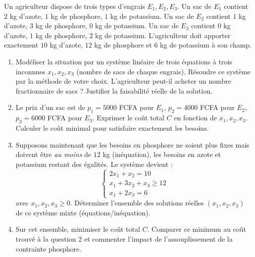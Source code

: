 \documentclass[11pt]{article}
\begin{document}
\begin{exercice}
Un agriculteur dispose de trois types d'engrais $E_1, E_2, E_3$. Un sac de $E_1$ contient $2$ kg d'azote, $1$ kg de phosphore, $1$ kg de potassium. Un sac de $E_2$ contient $1$ kg d'azote, $3$ kg de phosphore, $0$ kg de potassium. Un sac de $E_3$ contient $0$ kg d'azote, $1$ kg de phosphore, $2$ kg de potassium. L'agriculteur doit apporter exactement $10$ kg d'azote, $12$ kg de phosphore et $6$ kg de potassium à son champ.
\begin{enumerate}
    \item Modéliser la situation par un système linéaire de trois équations à trois inconnues $x_1, x_2, x_3$ (nombre de sacs de chaque engrais). Résoudre ce système par la méthode de votre choix. L'agriculteur peut-il acheter un nombre fractionnaire de sacs ? Justifier la faisabilité réelle de la solution.
    \item Le prix d'un sac est de $p_1 = 5000$ FCFA pour $E_1$, $p_2 = 4000$ FCFA pour $E_2$, $p_3 = 6000$ FCFA pour $E_3$. Exprimer le coût total $C$ en fonction de $x_1, x_2, x_3$. Calculer le coût minimal pour satisfaire exactement les besoins.
    \item Supposons maintenant que les besoins en phosphore ne soient plus fixes mais doivent être \textit{au moins} de $12$ kg (inéquation), les besoins en azote et potassium restant des égalités. Le système devient :
    \[
    \begin{cases}
    2x_1 + x_2 = 10 \\
    x_1 + 3x_2 + x_3 \geq 12 \\
    x_1 + 2x_3 = 6
    \end{cases}
    \]
    avec $x_1, x_2, x_3 \geq 0$. Déterminer l'ensemble des solutions réelles $(x_1, x_2, x_3)$ de ce système mixte (équations/inéquation).
    \item Sur cet ensemble, minimiser le coût total $C$. Comparer ce minimum au coût trouvé à la question 2 et commenter l'impact de l'assouplissement de la contrainte phosphore.
\end{enumerate}
\end{exercice}
\end{document}
